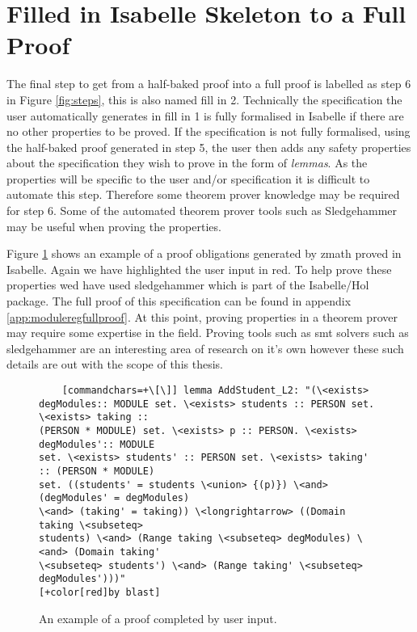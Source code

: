 \section{Filled in Isabelle Skeleton to a Full Proof}
\label{sec:isa2ful}

The final step to get from a half-baked proof into a full proof is labelled as
step 6 in Figure \ref{fig:steps}, this is also named fill in 2. Technically the
specification the user automatically generates in fill in 1 is fully formalised
in Isabelle if there are no other properties to be proved. If the specification
is not fully formalised, using the half-baked proof generated in step 5, the
user then adds any safety properties about the specification they wish to prove
in the form of \emph{lemmas}. As the properties will be specific to the user
and/or specification it is difficult to automate this step. Therefore some
theorem prover knowledge may be required for step 6. Some of the automated
theorem prover tools such as Sledgehammer \cite{sledgehammer} may be useful when
proving the properties.

Figure \ref{fig:exampleproof} shows an example of a proof obligations generated
by \gls{zmath} proved in Isabelle. Again we have highlighted the user input in
{\color{red}red}. To help prove these properties wed have used sledgehammer
\cite{sledgehammer} which is part of the Isabelle/Hol package. The full proof of
this specification can be found in appendix \ref{app:moduleregfullproof}. At
this point, proving properties in a theorem prover may require some expertise in
the field. Proving tools such as \gls{smt} solvers
\cite{DeMoura:2011:SMT:1995376.1995394} such as sledgehammer are an interesting
area of research on it's own however these such details are out with the scope
of this thesis.

\begin{center}
\begin{figure}[H]
\centering
\begin{footnotesize}
\begin{BVerbatim}
    [commandchars=+\[\]] lemma AddStudent_L2: "(\<exists>
degModules:: MODULE set. \<exists> students :: PERSON set. \<exists> taking ::
(PERSON * MODULE) set. \<exists> p :: PERSON. \<exists> degModules':: MODULE
set. \<exists> students' :: PERSON set. \<exists> taking' :: (PERSON * MODULE)
set. ((students' = students \<union> {(p)}) \<and> (degModules' = degModules)
\<and> (taking' = taking)) \<longrightarrow> ((Domain taking \<subseteq>
students) \<and> (Range taking \<subseteq> degModules) \<and> (Domain taking'
\<subseteq> students') \<and> (Range taking' \<subseteq> degModules')))"
[+color[red]by blast]
\end{BVerbatim}
\end{footnotesize}
\caption{\label{fig:exampleproof} An example of a proof completed by user input.}
\end{figure}
\end{center}

